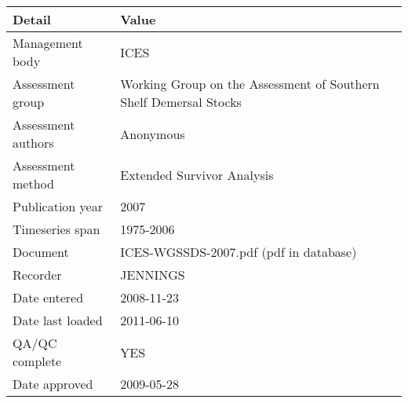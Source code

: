 \begin{table}[htb]
\centering
\begin{tabular}{lp{7cm}}
\toprule
Detail & Value \\
\midrule
Management body    & ICES                                                              \\
Assessment group   & Working Group on the Assessment of Southern Shelf Demersal Stocks \\
Assessment authors & Anonymous                                                         \\
Assessment method  & Extended Survivor Analysis                                        \\
Publication year   & 2007                                                              \\
Timeseries span    & 1975-2006                                                         \\
Document           & ICES-WGSSDS-2007.pdf (pdf in database)                            \\
Recorder           & JENNINGS                                                          \\
Date entered       & 2008-11-23                                                        \\
Date last loaded   & 2011-06-10                                                        \\
QA/QC complete     & YES                                                               \\
Date approved      & 2009-05-28                                                        \\
\bottomrule
\end{tabular}
\label{tab:assessdet}
\end{table}

